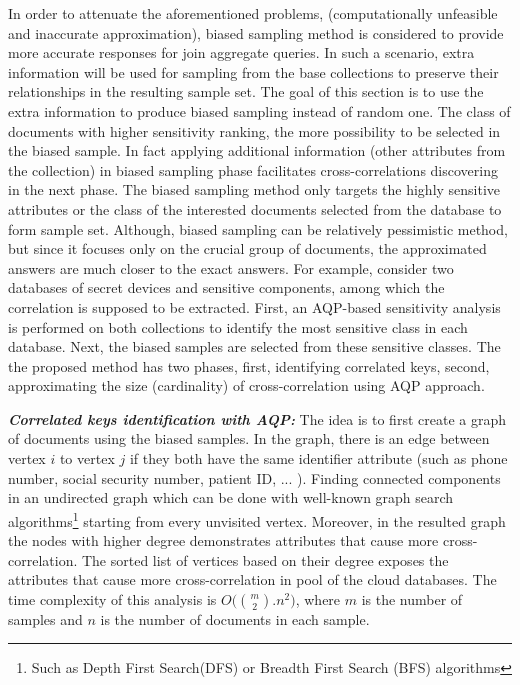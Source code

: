 In order to attenuate the aforementioned problems, (computationally unfeasible  and inaccurate approximation), biased sampling method is considered to  provide more accurate responses for join aggregate queries. In such a scenario, extra information will be used for sampling from the base collections to preserve their relationships in the resulting sample set. The goal of this section is to use the extra information to produce biased sampling instead of random one. The class of documents with higher sensitivity ranking, the more possibility to be selected in the biased sample. In fact applying additional information (other attributes from the collection) in biased sampling phase facilitates cross-correlations discovering in the next phase. The biased sampling method only targets the highly sensitive attributes or the class of the interested documents selected from the database to form sample set. Although, biased sampling can be relatively pessimistic method, but since it focuses only on the crucial group of documents, the approximated answers are much closer to the exact answers. For example, consider two databases of secret devices and sensitive components, among which the correlation is supposed to be extracted. First, an AQP-based sensitivity analysis is performed on both collections to identify the most sensitive class in each database. Next, the biased samples are selected from these sensitive classes. The the proposed method has two phases, first, identifying correlated keys, second, approximating the size (cardinality) of cross-correlation using AQP approach.

\noindent \textbf{\textit{Correlated keys identification with AQP:}} The idea is to first create a graph of documents using the biased samples. In the graph, there is an edge between vertex $i$ to vertex $j$ if they both have the same identifier attribute (such as phone number, social security number, patient ID, ... ). Finding connected components in an undirected graph which can be done with well-known graph search algorithms\footnote{Such as Depth First Search(DFS) or Breadth First Search (BFS) algorithms} starting from every unvisited vertex. Moreover, in the resulted graph the nodes with higher degree demonstrates attributes that cause more cross-correlation. The sorted list of vertices based on their degree exposes the attributes that cause more cross-correlation in pool of the cloud databases. The time complexity of this analysis is $O\big( \binom{m}{2}.n^2 \big)$, where $m$ is the number of samples and $n$ is the number of documents in each sample.

